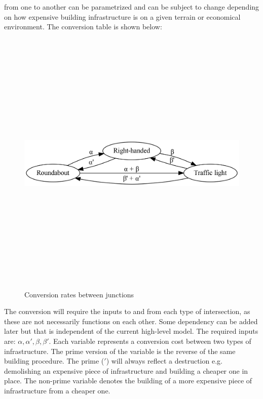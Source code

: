 \documentclass[
]{elteikthesis}[2023/04/10]
\begin{document}
from one to another can be parametrized and can be subject to change
depending on how expensive building infrastructure is on a given terrain
or economical environment. The conversion table is shown below: 
\begin{center}
\begin{figure}[H]
\begin{centering}
\includegraphics[width=13cm,height=13cm,keepaspectratio]{images/junctions}
\par\end{centering}
\caption{Conversion rates between junctions}
\end{figure}
\par\end{center}

The conversion will require the inputs to and from each type of intersection,
as these are not necessarily functions on each other. Some dependency
can be added later but that is independent of the current high-level
model. The required inputs are: $\alpha,\alpha\prime,\beta,\beta\prime$.
Each variable represents a conversion cost between two types of infrastructure.
The prime version of the variable is the reverse of the same building
procedure. The prime ($\prime$) will always reflect a destruction
e.g. demolishing an expensive piece of infrastructure and building
a cheaper one in place. The non-prime variable denotes the building
of a more expensive piece of infrastructure from a cheaper one.
\end{document}
